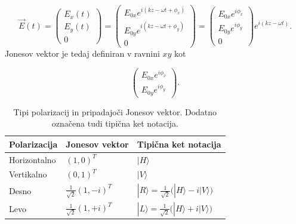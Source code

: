 \documentclass[12pt]{article}
\begin{document}
\begin{equation}
{\displaystyle \vec{E}(t) = {\begin{pmatrix}E_{x}(t)\\E_{y}(t)\\0\end{pmatrix}}={\begin{pmatrix}E_{0x}e^{i(kz-\omega t+\phi _{x})}\\E_{0y}e^{i(kz-\omega t+\phi _{y})}\\0\end{pmatrix}}={\begin{pmatrix}E_{0x}e^{i\phi _{x}}\\E_{0y}e^{i\phi _{y}}\\0\end{pmatrix}}e^{i(kz-\omega t)}.}
\end{equation}  
Jonesov vektor je tedaj definiran v ravnini $xy$ kot

\begin{equation}
{\displaystyle {\begin{pmatrix}E_{0x}e^{i\phi _{x}}\\E_{0y}e^{i\phi _{y}}\end{pmatrix}}.}
\end{equation} 

\begin{table}[h]
\centering
\renewcommand{\arraystretch}{1.5} %
\begin{tabular}{|l|l|l|}

\hline
\textbf{Polarizacija} & \textbf{Jonesov vektor}                                       & \textbf{Tipična ket notacija}                                                               \\ \hline
Horizontalno          & $ (1,0)^T $                          & $ |H\rangle $                                                                               \\ \hline
Vertikalno            & $(0,1)^T$                          & $ |V\rangle $                                                                               \\ \hline
Desno                 & ${\frac  {1}{{\sqrt  2}}}{(1, -i)^T}$ & $ { |R\rangle ={\frac {1}{\sqrt {2}}}{\big (}|H\rangle -i|V\rangle {\big )}} $ \\ \hline
Levo                  & $ {\frac  {1}{{\sqrt  2}}}{(1, +i)^T} $ & $ { |L\rangle ={\frac {1}{\sqrt {2}}}{\big (}|H\rangle +i|V\rangle {\big )}} $ \\ \hline
\end{tabular}
\caption{Tipi polarizacij in pripadajoči Jonesov vektor. Dodatno označena tudi tipična ket notacija. \cite{JonesCalculus2023} }
\label{tab:pol}
\end{table}
\end{document}
